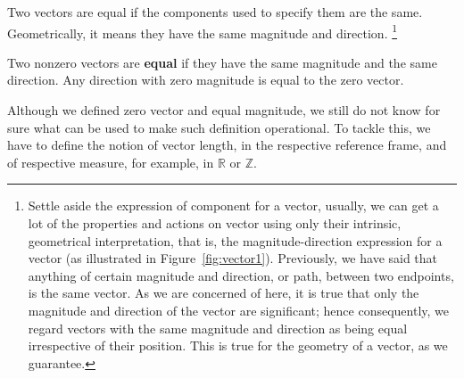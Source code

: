 Two vectors are equal if the components used to specify them are the same. Geometrically, it means they have the same magnitude and direction. \footnote{Settle aside the expression of component for a vector, usually, we can get a lot of the properties and actions on vector using only their intrinsic, geometrical interpretation, that is, the magnitude-direction expression for a vector (as illustrated in Figure~\ref{fig:vector1}). Previously, we have said that anything of certain magnitude and direction, or path, between two endpoints, is the same vector. As we are concerned of here, it is true that only the magnitude and direction of the vector are significant; hence consequently, we regard vectors with the same magnitude and direction as being equal irrespective of their position. This is true for the geometry of a vector, as we guarantee.}
\begin{definition}
    Two nonzero vectors are \textbf{equal} if they have the same magnitude and the same direction. Any direction with zero magnitude is equal to the zero vector. 
\end{definition}

Although we defined zero vector and equal magnitude, we still do not know for sure what can be used to make such definition operational. To tackle this, we have to define the notion of vector length, in the respective reference frame, and of respective measure, for example, in $\mathbb{R}$ or $\mathbb{Z}$. 

